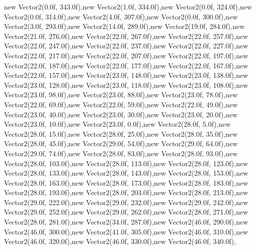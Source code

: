 new Vector2(0.0f, 343.0f),new Vector2(1.0f, 334.0f),new Vector2(0.0f, 324.0f),new Vector2(0.0f, 314.0f),new Vector2(4.0f, 307.0f),new Vector2(0.0f, 300.0f),new Vector2(3.0f, 293.0f),new Vector2(14.0f, 289.0f),new Vector2(19.0f, 284.0f),new Vector2(21.0f, 276.0f),new Vector2(22.0f, 267.0f),new Vector2(22.0f, 257.0f),new Vector2(22.0f, 247.0f),new Vector2(22.0f, 237.0f),new Vector2(22.0f, 227.0f),new Vector2(22.0f, 217.0f),new Vector2(22.0f, 207.0f),new Vector2(22.0f, 197.0f),new Vector2(22.0f, 187.0f),new Vector2(22.0f, 177.0f),new Vector2(22.0f, 167.0f),new Vector2(22.0f, 157.0f),new Vector2(23.0f, 148.0f),new Vector2(23.0f, 138.0f),new Vector2(23.0f, 128.0f),new Vector2(23.0f, 118.0f),new Vector2(23.0f, 108.0f),new Vector2(23.0f, 98.0f),new Vector2(23.0f, 88.0f),new Vector2(23.0f, 78.0f),new Vector2(22.0f, 69.0f),new Vector2(22.0f, 59.0f),new Vector2(22.0f, 49.0f),new Vector2(23.0f, 40.0f),new Vector2(23.0f, 30.0f),new Vector2(23.0f, 20.0f),new Vector2(23.0f, 10.0f),new Vector2(23.0f, 0.0f),new Vector2(28.0f, 5.0f),new Vector2(28.0f, 15.0f),new Vector2(28.0f, 25.0f),new Vector2(28.0f, 35.0f),new Vector2(28.0f, 45.0f),new Vector2(29.0f, 54.0f),new Vector2(29.0f, 64.0f),new Vector2(29.0f, 74.0f),new Vector2(28.0f, 83.0f),new Vector2(28.0f, 93.0f),new Vector2(28.0f, 103.0f),new Vector2(28.0f, 113.0f),new Vector2(28.0f, 123.0f),new Vector2(28.0f, 133.0f),new Vector2(28.0f, 143.0f),new Vector2(28.0f, 153.0f),new Vector2(28.0f, 163.0f),new Vector2(28.0f, 173.0f),new Vector2(28.0f, 183.0f),new Vector2(28.0f, 193.0f),new Vector2(28.0f, 203.0f),new Vector2(28.0f, 213.0f),new Vector2(29.0f, 222.0f),new Vector2(29.0f, 232.0f),new Vector2(29.0f, 242.0f),new Vector2(29.0f, 252.0f),new Vector2(29.0f, 262.0f),new Vector2(28.0f, 271.0f),new Vector2(28.0f, 281.0f),new Vector2(34.0f, 287.0f),new Vector2(46.0f, 290.0f),new Vector2(46.0f, 300.0f),new Vector2(41.0f, 305.0f),new Vector2(46.0f, 310.0f),new Vector2(46.0f, 320.0f),new Vector2(46.0f, 330.0f),new Vector2(46.0f, 340.0f),